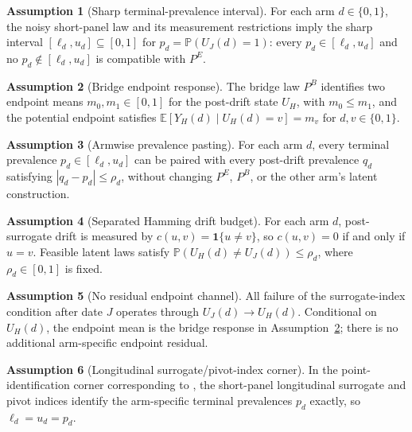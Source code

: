 \documentclass[11pt]{article}
\newcommand{\E}{\mathbb{E}}
\renewcommand{\Pr}{\mathbb{P}}
\newcommand{\one}{\mathbf{1}}
\theoremstyle{definition}
\newtheorem{assumption}{Assumption}
\theoremstyle{plain}
\theoremstyle{remark}
\begin{document}
\begin{assumption}[Sharp terminal-prevalence interval]\label{ass:terminal-interval}
For each arm \(d\in\{0,1\}\), the noisy short-panel law and its measurement restrictions imply the sharp interval \([\ell_d,u_d]\subseteq[0,1]\) for \(p_d=\Pr(U_J(d)=1)\): every \(p_d\in[\ell_d,u_d]\) and no \(p_d\notin[\ell_d,u_d]\) is compatible with \(P^E\).
\end{assumption}

\begin{assumption}[Bridge endpoint response]\label{ass:bridge-response}
The bridge law \(P^B\) identifies two endpoint means \(m_0,m_1\in[0,1]\) for the post-drift state \(U_H\), with \(m_0\le m_1\), and the potential endpoint satisfies \(\E[Y_H(d)\mid U_H(d)=v]=m_v\) for \(d,v\in\{0,1\}\).
\end{assumption}

\begin{assumption}[Armwise prevalence pasting]\label{ass:armwise-pasting}
For each arm \(d\), every terminal prevalence \(p_d\in[\ell_d,u_d]\) can be paired with every post-drift prevalence \(q_d\) satisfying \(|q_d-p_d|\le\rho_d\), without changing \(P^E\), \(P^B\), or the other arm's latent construction.
\end{assumption}

\begin{assumption}[Separated Hamming drift budget]\label{ass:hamming-drift}
For each arm \(d\), post-surrogate drift is measured by \(c(u,v)=\one\{u\ne v\}\), so \(c(u,v)=0\) if and only if \(u=v\).  Feasible latent laws satisfy \(\Pr(U_H(d)\ne U_J(d))\le\rho_d\), where \(\rho_d\in[0,1]\) is fixed.
\end{assumption}

\begin{assumption}[No residual endpoint channel]\label{ass:no-residual-channel}
All failure of the surrogate-index condition after date \(J\) operates through \(U_J(d)\to U_H(d)\).  Conditional on \(U_H(d)\), the endpoint mean is the bridge response in Assumption~\ref{ass:bridge-response}; there is no additional arm-specific endpoint residual.
\end{assumption}

\begin{assumption}[Longitudinal surrogate/pivot-index corner]\label{ass:pivot-corner}
In the point-identification corner corresponding to \citet{HuangWangYuanZhaoZhang2026}, the short-panel longitudinal surrogate and pivot indices identify the arm-specific terminal prevalences \(p_d\) exactly, so \(\ell_d=u_d=p_d\).
\end{assumption}
\end{document}
